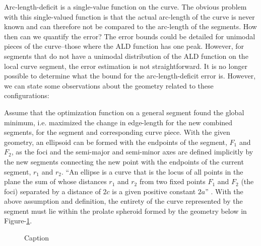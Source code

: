 \documentclass[preprint,12pt]{elsarticle}
\begin{document}
        Arc-length-deficit is a single-value function on the curve.  The obvious problem with this single-valued function is that the actual arc-length of the curve is never known and can therefore not be compared to the arc-length of the segments.  How then can we quantify the error?  The error bounds could be detailed for unimodal pieces of the curve--those where the ALD function has one peak. However, for segments that do not have a unimodal distribution of the ALD function on the local curve segment, the error estimation is not straightforward.  It is no longer possible to determine what the bound for the arc-length-deficit error is.  However, we can state some observations about the geometry related to these configurations:

Assume that the optimization function on a general segment found the global minimum, i.e. maximized the change in edge-length for the new combined segments, for the segment and corresponding curve piece.  With the given geometry, an ellipsoid can be formed with the endpoints of the segment, $F_1$ and $F_2$, as the foci and the semi-major and semi-minor axes are defined implicitly by the new segments connecting the new point with the endpoints of the current segment, $r_1$ and $r_2$.  ``An ellipse is a curve that is the locus of all points in the plane the sum of whose distances $r_1$ and $r_2$ from two fixed points $F_1$ and $F_2$ (the foci) separated by a distance of $2c$ is a given positive constant $2a$'' \cite{weissteine}.  With the above assumption and definition, the entirety of the curve represented by the segment must lie within the prolate spheroid  formed by the geometry below in Figure-\ref{EllipseGeometry}.

\begin{figure}[h!]
  \caption{\label{EllipseGeometry} Caption}
\end{figure}
\end{document}
